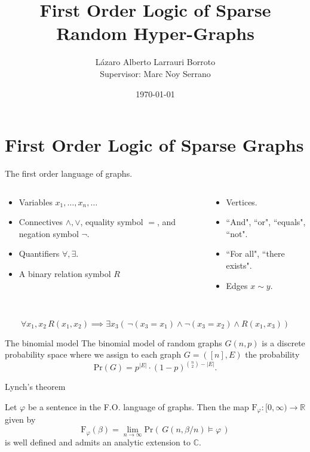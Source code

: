 \documentclass[handout, 11pt]{beamer}
\title[First Order Logic of Sparse Random Hyper-Graphs]{First Order
	Logic of Sparse Random Hyper-Graphs}
\author{L\'azaro Alberto Larrauri Borroto \\ 
	Supervisor: Marc Noy Serrano}
\date\today
\newcommand{\CC}{\mathbb{C}}
\newcommand{\R}{\mathbb{R}}
\newcommand{\Ln}{\lim\limits_{n\to \infty}}
\begin{document}
	\frame{\titlepage}
	\frame{\tableofcontents}


	\section{First Order Logic of Sparse Graphs}
	\begin{frame}{The first order language of graphs.}
		\begin{columns}
			\begin{column}{0.55\textwidth}
				\begin{itemize}
					\item Variables $x_1, \dots, x_n, \dots$
					\item Connectives $\wedge, \vee$, equality symbol $=$,
					and negation symbol $\neg$.
					\item Quantifiers $\forall, \exists$.
					\item A binary relation symbol $R$
				\end{itemize}
			\end{column}
			\begin{column}{0.45\textwidth}
				\begin{itemize}
					\item Vertices.
					\item ``And", ``or", ``equals", ``not".
					\item ``For all", ``there exists".
					\item Edges $x\sim y$. 
				\end{itemize}
			\end{column}
		\end{columns}
		~\\
		\[ \forall x_1,x_2 \, R(x_1,x_2) \implies \exists x_3 (\,
		\neg(x_3=x_1)\wedge \neg(x_3=x_2) \wedge R(x_1, x_3))\]
	\end{frame}

	\begin{frame}{The binomial model}
	The binomial model of random graphs $G(n,p)$ is a discrete probability space where 
	we assign to each graph $G=([n],E)$ the probability
	\[\mathrm{Pr}(G)= p^{|E|}\cdot (1-p)^{\binom{n}{2}- |E| }. \]
	\end{frame}

	\begin{frame}{Lynch's theorem}
	\begin{theorem}[Lynch, 1992]
		Let $\varphi$ be a sentence in the F.O. language of graphs. 
		Then the map $\mathrm{F}_\varphi: [0,\infty) \rightarrow \R$ given by 
		\[\mathrm{F}_\varphi(\beta)=\Ln \mathrm{Pr}(\, G(n,\beta/n)\models \varphi \,) \]
		is well defined and admits an analytic extension to $\CC$.
	\end{theorem}
	\end{frame}
	
\end{document}
